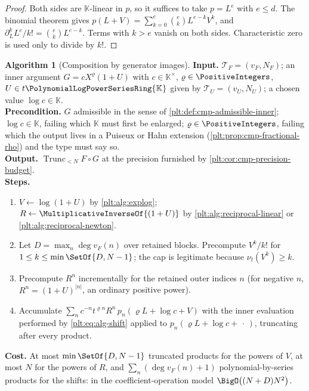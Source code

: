\documentclass[11pt,oneside]{article}
\theoremstyle{plain}
\theoremstyle{definition}
\newtheorem{algorithm}[theorem]{Algorithm}
\theoremstyle{remark}
\newcommand{\K}{\mathbb{K}}
\newcommand{\PLpow}{\PolynomialLogPowerSeriesRing{\K}}   %
\newcommand{\ordt}{\nu_{t}}                              %
\newcommand{\Trunc}[2]{\operatorname{Trunc}_{<#2}#1}     %
\newcommand{\compose}{\mathbin{\circ}}
\begin{document}
\begin{proof}
Both sides are \(\K\)-linear in \(p\), so it suffices to take \(p=L^{e}\) with
\(e\le d\).  The binomial theorem gives
\(p(L+V)=\sum_{k=0}^{e}\binom ek L^{e-k}V^k\), and
\(\partial_L^kL^{e}/k!=\binom ekL^{e-k}\).  Terms with \(k>e\) vanish on both
sides.  Characteristic zero is used only to divide by \(k!\).
\end{proof}

\begin{algorithm}[Composition by generator images]
\label{plt:alg:compose-generators}
\textbf{Input.}  \(\mathcal T_F=(v_F,N_F)\); an inner argument
\(G=cX^{\varrho}(1+U)\) with \(c\in\K^{\times}\),
\(\varrho\in\PositiveIntegers\), \(U\in t\PLpow\) given by
\(\mathcal T_U=(v_U,N_U)\); a chosen value \(\log c\in\K\).\\
\textbf{Precondition.}  \(G\) admissible in the sense of
\cref{plt:def:cmp-admissible-inner}; \(\log c\in\K\), failing which \(\K\) must
first be enlarged; \(\varrho\in\PositiveIntegers\), failing which the output
lives in a Puiseux or Hahn extension
(\cref{plt:prop:cmp-fractional-rho}) and the type must say so.\\
\textbf{Output.}  \(\Trunc{F\compose G}{N}\) at the precision furnished by
\cref{plt:cor:cmp-precision-budget}.\\
\textbf{Steps.}
\begin{enumerate}
\item \(V\leftarrow\log(1+U)\) by \cref{plt:alg:explog};
      \(R\leftarrow\MultiplicativeInverseOf{(1+U)}\) by
      \cref{plt:alg:reciprocal-linear} or \cref{plt:alg:reciprocal-newton}.
\item Let \(D=\max_n\deg v_F(n)\) over retained blocks.  Precompute
      \(V^k/k!\) for \(1\le k\le\min\SetOf{D,N-1}\); the cap is legitimate
      because \(\ordt(V^k)\ge k\).
\item Precompute \(R^{n}\) incrementally for the retained outer indices \(n\)
      (for negative \(n\), \(R^{n}=(1+U)^{|n|}\), an ordinary positive power).
\item Accumulate
      \(\sum_n c^{-n}t^{\varrho n}R^{n}\,
        p_n(\varrho L+\log c+V)\)
      with the inner evaluation performed by \cref{plt:eq:alg-shift} applied to
      \(p_n(\varrho L+\log c+\,\cdot\,)\), truncating after every product.
\end{enumerate}
\textbf{Cost.}  At most \(\min\SetOf{D,N-1}\) truncated products for the powers
of \(V\), at most \(N\) for the powers of \(R\), and
\(\sum_n(\deg v_F(n)+1)\) polynomial-by-series products for the shifts: in the
coefficient-operation model \(\BigO\bigl((N+D)N^2\bigr)\).
\end{algorithm}
\end{document}
